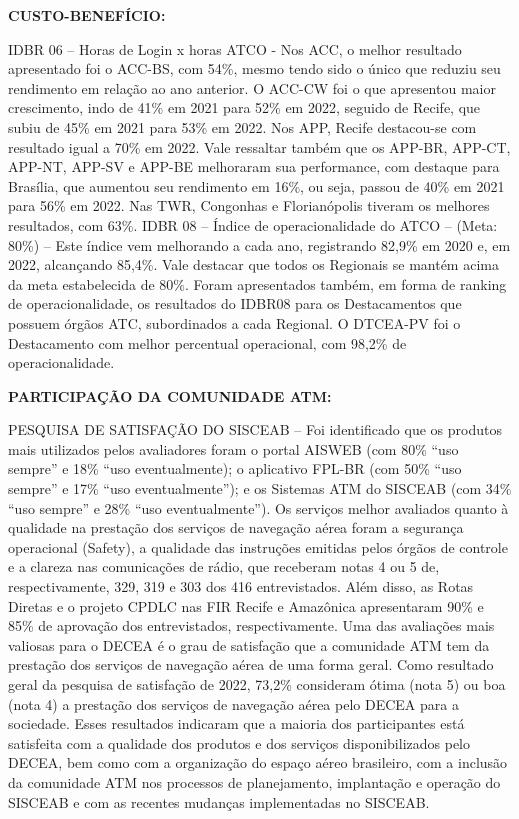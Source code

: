 \documentclass[
]{book}
\begin{document}
\textbf{CUSTO-BENEFÍCIO:}

IDBR 06 -- Horas de Login x horas ATCO - Nos ACC, o melhor resultado apresentado foi o ACC-BS, com 54\%, mesmo tendo sido o único que reduziu seu rendimento em relação ao ano anterior. O ACC-CW foi o que apresentou maior crescimento, indo de 41\% em 2021 para 52\% em 2022, seguido de Recife, que subiu de 45\% em 2021 para 53\% em 2022. Nos APP, Recife destacou-se com resultado igual a 70\% em 2022. Vale ressaltar também que os APP-BR, APP-CT, APP-NT, APP-SV e APP-BE melhoraram sua performance, com destaque para Brasília, que aumentou seu rendimento em 16\%, ou seja, passou de 40\% em 2021 para 56\% em 2022. Nas TWR, Congonhas e Florianópolis tiveram os melhores resultados, com 63\%.
IDBR 08 -- Índice de operacionalidade do ATCO -- (Meta: 80\%) -- Este índice vem melhorando a cada ano, registrando 82,9\% em 2020 e, em 2022, alcançando 85,4\%. Vale destacar que todos os Regionais se mantém acima da meta estabelecida de 80\%. Foram apresentados também, em forma de ranking de operacionalidade, os resultados do IDBR08 para os Destacamentos que possuem órgãos ATC, subordinados a cada Regional. O DTCEA-PV foi o Destacamento com melhor percentual operacional, com 98,2\% de operacionalidade.

\textbf{PARTICIPAÇÃO DA COMUNIDADE ATM:}

PESQUISA DE SATISFAÇÃO DO SISCEAB -- Foi identificado que os produtos mais utilizados pelos avaliadores foram o portal AISWEB (com 80\% ``uso sempre'' e 18\% ``uso eventualmente); o aplicativo FPL-BR (com 50\% ``uso sempre'' e 17\% ``uso eventualmente''); e os Sistemas ATM do SISCEAB (com 34\% ``uso sempre'' e 28\% ``uso eventualmente''). Os serviços melhor avaliados quanto à qualidade na prestação dos serviços de navegação aérea foram a segurança operacional (Safety), a qualidade das instruções emitidas pelos órgãos de controle e a clareza nas comunicações de rádio, que receberam notas 4 ou 5 de, respectivamente, 329, 319 e 303 dos 416 entrevistados. Além disso, as Rotas Diretas e o projeto CPDLC nas FIR Recife e Amazônica apresentaram 90\% e 85\% de aprovação dos entrevistados, respectivamente. Uma das avaliações mais valiosas para o DECEA é o grau de satisfação que a comunidade ATM tem da prestação dos serviços de navegação aérea de uma forma geral. Como resultado geral da pesquisa de satisfação de 2022, 73,2\% consideram ótima (nota 5) ou boa (nota 4) a prestação dos serviços de navegação aérea pelo DECEA para a sociedade. Esses resultados indicaram que a maioria dos participantes está satisfeita com a qualidade dos produtos e dos serviços disponibilizados pelo DECEA, bem como com a organização do espaço aéreo brasileiro, com a inclusão da comunidade ATM nos processos de planejamento, implantação e operação do SISCEAB e com as recentes mudanças implementadas no SISCEAB.
\end{document}
